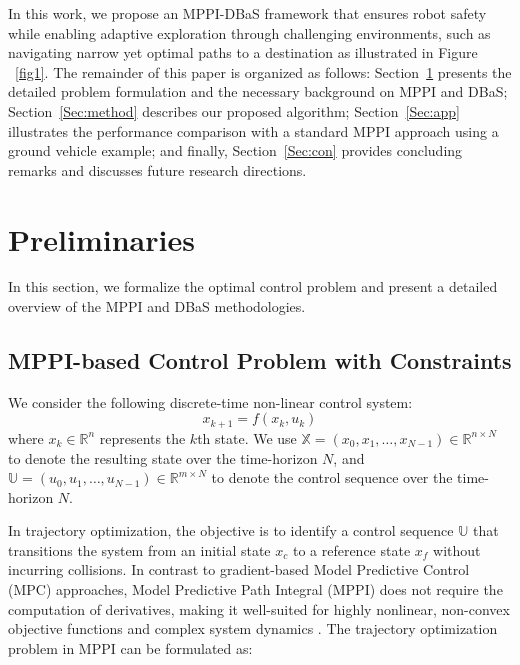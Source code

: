 \documentclass[english]{cccconf}
\begin{document}
In this work, we propose an MPPI-DBaS framework that ensures robot safety while enabling adaptive exploration through challenging environments, such as navigating narrow yet optimal paths to a destination as illustrated in Figure ~\ref{fig1}. The remainder of this paper is organized as follows: Section~\ref{Sec:prelim} presents the detailed problem formulation and the necessary background on MPPI and DBaS; Section~\ref{Sec:method} describes our proposed algorithm; Section~\ref{Sec:app} illustrates the performance comparison with a standard MPPI approach using a ground vehicle example; and finally, Section~\ref{Sec:con} provides concluding remarks and discusses future research directions.



\section{Preliminaries} \label{Sec:prelim}
In this section, we formalize the optimal control problem and present a detailed overview of the MPPI and DBaS methodologies.

\subsection{MPPI-based Control Problem with Constraints}
We consider the following discrete-time non-linear control system:
\begin{equation}\label{eq:nonmial_dyn}
    x_{k+1} = f(x_k, u_k)
\end{equation}
where $x_k \in \mathbb{R}^n$ represents the $k$th state.
We use $\mathbb{X} = (x_0, x_1, \ldots, x_{N-1}) \in \mathbb{R}^{n \times N}$ to denote the resulting state over the time-horizon $N$, and $\mathbb{U} = (u_0, u_1, \ldots, u_{N-1}) \in \mathbb{R}^{m \times N}$ to denote the control sequence over the time-horizon $N$. 


In trajectory optimization, the objective is to identify a control sequence \(\mathbb{U}\) that transitions the system from an initial state \(x_c\) to a reference state \(x_f\) without incurring collisions. In contrast to gradient-based Model Predictive Control (MPC) approaches, Model Predictive Path Integral (MPPI) does not require the computation of derivatives, making it well-suited for highly nonlinear, non-convex objective functions and complex system dynamics \cite{williams2017model}. The trajectory optimization problem in MPPI can be formulated as:
\end{document}
